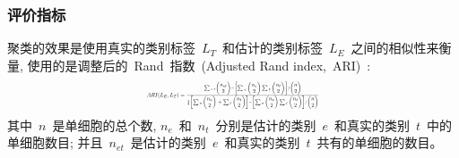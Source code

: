 \subsubsection{评价指标}
聚类的效果是使用真实的类别标签~$L_T$~和估计的类别标签~$L_E$~之间的相似性来衡量,
使用的是调整后的~Rand~指数~(Adjusted Rand index,~ARI)~\cite{hubert1985comparing,wu2005dynamic}:
\begin{equation}
\label{eq:ARI}
\resizebox{0.4\textwidth}{!}{$
    ARI(L_E,L_T)=\frac{\sum_{}{}_{e,t} \begin{pmatrix}n_{et}\\ 2\end{pmatrix} - \begin{bmatrix}  \sum_{}{}_{e} \begin{pmatrix}n_{e}\\ 2\end{pmatrix}\sum_{}{}_{t} \begin{pmatrix}n_{t}\\ 2\end{pmatrix}  \end{bmatrix} / \begin{pmatrix}n\\ 2\end{pmatrix} 
    }{\frac{1}{2}\begin{bmatrix}
    \sum{}{}_e\begin{pmatrix}n_{e}\\ 2\end{pmatrix} + \sum{}{}_t\begin{pmatrix}n_{t}\\ 2\end{pmatrix}
    \end{bmatrix} - \begin{bmatrix}
    \sum{}{}_e\begin{pmatrix}n_{e}\\ 2\end{pmatrix} \sum{}{}_t\begin{pmatrix}n_{t}\\ 2\end{pmatrix} 
    \end{bmatrix}/\begin{pmatrix}n\\ 2\end{pmatrix}}    
$}
\end{equation}
其中~$n$~是单细胞的总个数, 
$n_e$~和~$n_t$~分别是估计的类别~$e$~和真实的类别~$t$~中的单细胞数目; 
并且~$n_{et}$~是估计的类别~$e$~和真实的类别~$t$~共有的单细胞的数目。

